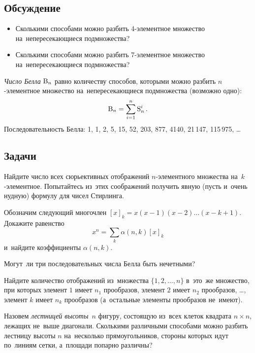 \subsection*{Обсуждение}

\begin{itemize}

\item
Сколькими способами можно разбить 4-элементное множество на~непересекающиеся
подмножества?

\item
Сколькими способами можно разбить 7-элементное множество на~непересекающиеся
подмножества?

\end{itemize}

\emph{Число Белла} $\mathrm{B}_{n}$ равно количеству способов, которыми можно
разбить $n$-элементное множество на~непересекающиеся подмножества
(возможно одно):
\[
    \mathrm{B}_{n}
=
    \sum_{i=1}^{n}
        \mathrm{S}_{n}^{i}
\, . \]
Последовательность Белла:
1, 1, 2, 5, 15, 52, 203, 877, 4140, 21\,147, 115\,975, \ldots


\subsection*{Задачи}

\begin{problems}

\item
Найдите число всех сюрьективных отображений $n$-элементного множества
на~$k$-эле\-мен\-тное.
Попытайтесь из~этих соображений получить явную (пусть и~очень нудную) формулу
для чисел Стирлинга.

\item
Обозначим следующий многочлен $[x]_{k} = x (x - 1) (x - 2) \ldots (x - k + 1)$.
Докажите равенство
\[
    x^{n} = \sum_{k} \alpha(n, k) [x]_{k}
\]
и~найдите коэффициенты $\alpha(n, k)$.

\item
Могут~ли три последовательных числа Белла быть нечетными?

\item
Найдите количество отображений из~множества $\{1, 2, \ldots, n\}$ в~это~же
множество, при которых
элемент $1$ имеет $n_{1}$ прообразов,
элемент $2$ имеет $n_{2}$ прообразов, \ldots,
элемент $k$ имеет $n_{k}$ прообразов
(а~остальные элементы прообразов не~имеют).

\item
Назовем \emph{лестницей высоты~$n$} фигуру, состоящую из~всех клеток
квадрата $n \times n$, лежащих не~выше диагонали.
Сколькими различными способами можно разбить лестницу высоты $n$ на~несколько
прямоугольников, стороны которых идут по~линиям сетки, а~площади попарно
различны?

\end{problems}

\endgroup %


